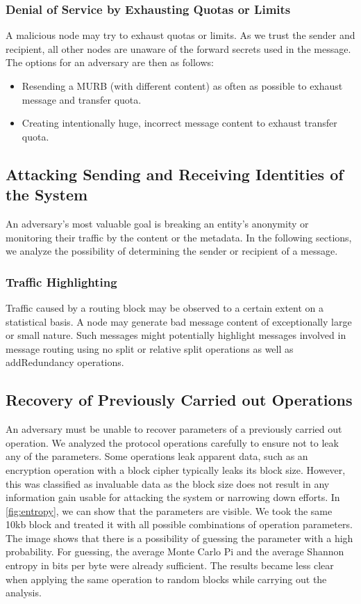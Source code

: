 \subsubsection{Denial of Service by Exhausting Quotas or Limits}
A malicious node may try to exhaust quotas or limits. As we trust the sender and recipient, all other nodes are unaware of the forward secrets used in the message. The options for an adversary are then as follows:

\begin{itemize}
	\item Resending a MURB (with different content) as often as possible to exhaust message and transfer quota. 
	\item Creating intentionally huge, incorrect message content to exhaust transfer quota.
\end{itemize}

\subsection{Attacking Sending and Receiving Identities of the \MessageVortex{} System}
An adversary's most valuable goal is breaking an entity's anonymity or monitoring their traffic by the content or the metadata. In the following sections, we analyze the possibility of determining the sender or recipient of a message.


\subsubsection{Traffic Highlighting}
Traffic caused by a routing block may be observed to a certain extent on a statistical basis. A node may generate bad message content of exceptionally large or small nature. Such messages might potentially highlight messages involved in message routing using no split or relative split operations as well as addRedundancy operations.

\subsection{Recovery of Previously Carried out Operations}
An adversary must be unable to recover parameters of a previously carried out operation. We analyzed the protocol operations carefully to ensure not to leak any of the parameters. Some operations leak apparent data, such as an encryption operation with a block cipher typically leaks its block size. However, this was classified as invaluable data as the block size does not result in any information gain usable for attacking the system or narrowing down efforts. In \cref{fig:entropy}, we can show that the parameters are visible. We took the same 10kb block and treated it with all possible combinations of operation parameters. The image shows that there is a possibility of guessing the parameter with a high probability. For guessing, the average Monte Carlo Pi and the average Shannon entropy in bits per byte were already sufficient. The results became less clear when applying the same operation to random blocks while carrying out the analysis. 

